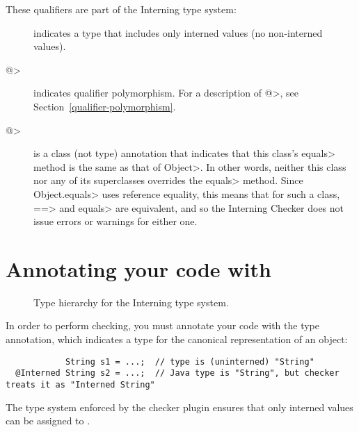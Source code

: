 These qualifiers are part of the Interning type system:

\begin{description}

\item[]
  indicates a type that includes only interned values (no non-interned
  values).

\item[\<@>]
  indicates qualifier polymorphism.  For a description of
  \<@>, see
  Section~\ref{qualifier-polymorphism}.

\item[\<@>]
  is a class (not type) annotation that indicates that this class's
  \<equals> method is the same as that of \<Object>.  In other words,
  neither this class nor any of its superclasses overrides the \<equals>
  method.  Since \<Object.equals> uses reference equality, this means that
  for such a class, \<==> and \<equals> are equivalent, and so the
  Interning Checker does not issue errors or warnings for either one.

\end{description}


\section{Annotating your code with \label{annotating-with-interned}}

\begin{figure}
\caption{Type hierarchy for the Interning type system.}
\label{fig:interning-hierarchy}
\end{figure}

In order to perform checking, you must annotate your code with the 
type annotation, which indicates a type for the canonical representation of an
object:

\begin{Verbatim}
            String s1 = ...;  // type is (uninterned) "String"
  @Interned String s2 = ...;  // Java type is "String", but checker treats it as "Interned String"
\end{Verbatim}

The type system enforced by the checker plugin ensures that only interned
values can be assigned to .

